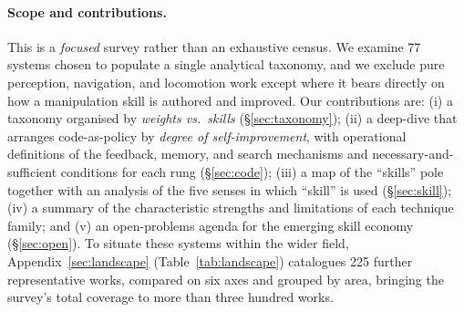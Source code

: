 \PassOptionsToPackage{svgnames,dvipsnames}{xcolor} \documentclass[acmsmall,screen,nonacm]{acmart}
\begin{document}
\paragraph{Scope and contributions.}
This is a \emph{focused} survey rather than an exhaustive census. We examine 77 systems chosen
to populate a single analytical taxonomy, and we exclude pure perception, navigation, and
locomotion work except where it bears directly on how a manipulation skill is authored and
improved. Our contributions are: (i) a taxonomy organised by \emph{weights vs.\ skills}
(\S\ref{sec:taxonomy}); (ii) a deep-dive that arranges code-as-policy by \emph{degree of
self-improvement}, with operational definitions of the feedback, memory, and search mechanisms
and necessary-and-sufficient conditions for each rung (\S\ref{sec:code}); (iii) a map of the
``skills'' pole together with an analysis of the five senses in which ``skill'' is used
(\S\ref{sec:skill}); (iv) a summary of the characteristic strengths and limitations of each
technique family; and (v) an open-problems agenda for the emerging skill economy
(\S\ref{sec:open}). To situate these systems within the wider field,
Appendix~\ref{sec:landscape} (Table~\ref{tab:landscape}) catalogues 225 further representative
works, compared on six axes and grouped by area, bringing the survey's total coverage to more than
three hundred works.
\end{document}
